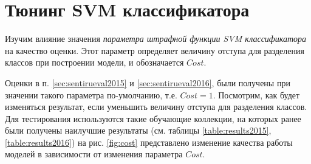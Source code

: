 \section{Тюнинг SVM классификатора}
Изучим влияние значения {\it параметра штрафной функции SVM классификатора} на
качество оценки.
Этот параметр определяет величину отступа для разделения классов при построении
модели, и обозначается $Cost$.

Оценки в п. \ref{sec:sentirueval2015} и \ref{sec:sentirueval2016},
были получены при значении такого параметра по-умолчанию, т.е. $Cost=1$.
Посмотрим, как будет изменяться результат, если уменьшить величину отступа для
разделения классов.
Для тестирования используются такие обучающие коллекции, на которых ранее были
получены наилучшие результаты (см. таблицы \ref{table:results2015}, \ref{table:results2016})
на рис. \ref{fig:cost} представлено изменение качества работы моделей в
зависимости от изменения параметра $Cost$.

